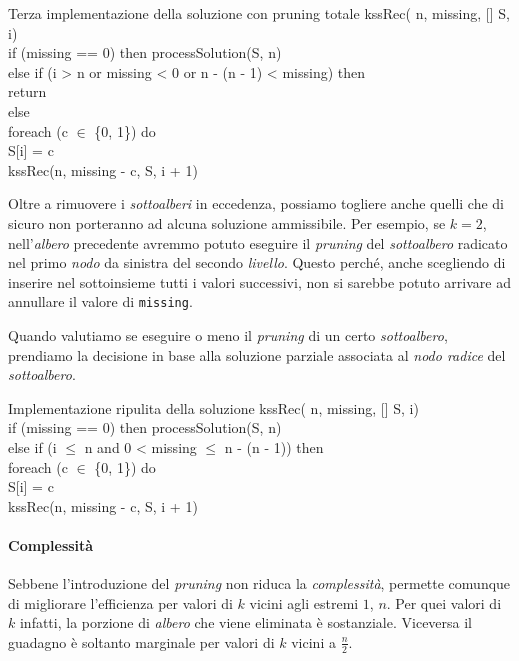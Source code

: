 \begin{minicode}{Terza implementazione della soluzione con pruning totale}
\ind kssRec( n,  missing, [] S,  i)\\
    \indf if (missing == 0) then\hfill{}
        processSolution(S, n)\\
    \indf else if (i > n or missing < 0 or n - (n - 1) < missing) then\\
        return\\
    \indf else\\
        \indff foreach (c $\in$ \{0, 1\}) do\\
            S[i] = c\\
            kssRec(n, missing - c, S, i + 1)
\end{minicode}

\noindent
Oltre a rimuovere i \emph{sottoalberi} in eccedenza, possiamo togliere anche
quelli che di sicuro non porteranno ad alcuna soluzione ammissibile. Per esempio,
se $k=2$, nell'\emph{albero} precedente avremmo potuto eseguire il \emph{pruning}
del \emph{sottoalbero} radicato nel primo \emph{nodo} da sinistra del secondo
\emph{livello}. Questo perché, anche scegliendo di inserire nel sottoinsieme
tutti i valori successivi, non si sarebbe potuto arrivare ad annullare il valore
di \texttt{missing}.

\begin{note}
    Quando valutiamo se eseguire o meno il \emph{pruning} di un certo
    \emph{sottoalbero}, prendiamo la decisione in base alla soluzione parziale
    associata al \emph{nodo radice} del \emph{sottoalbero}.
\end{note}

\begin{minicode}{Implementazione ripulita della soluzione}
\ind kssRec( n,  missing, [] S,  i)\\
    \indf if (missing == 0) then\hfill{}
        processSolution(S, n)\\
    \indf else if (i $\leq$ n and 0 < missing $\leq$ n - (n - 1)) then\\
        \indff foreach (c $\in$ \{0, 1\}) do\\
            S[i] = c\\
            kssRec(n, missing - c, S, i + 1)
\end{minicode}

\paragraph{Complessità}
Sebbene l'introduzione del \emph{pruning} non riduca la \emph{complessità},
permette comunque di migliorare l'efficienza per valori di $k$ vicini agli
estremi $1$, $n$. Per quei valori di $k$ infatti, la porzione di \emph{albero}
che viene eliminata è sostanziale. Viceversa il guadagno è soltanto marginale
per valori di $k$ vicini a $\frac{n}{2}$.

